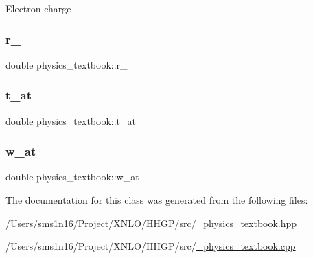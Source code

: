Electron charge \mbox{\label{classphysics__textbook_ac429976f0dc885d846d8b31c24f45bd6}} 
\subsubsection{\texorpdfstring{r\+\_}{r\_0}}
{\footnotesize\ttfamily double physics\+\_\+textbook\+::r\+\_}

\mbox{\label{classphysics__textbook_acdcf772ff70c544f8394b3a9fc57674c}} 
\subsubsection{\texorpdfstring{t\+\_\+at}{t\_at}}
{\footnotesize\ttfamily double physics\+\_\+textbook\+::t\+\_\+at}

\mbox{\label{classphysics__textbook_a63250c79f053fa4aa1c8f3505971b4f1}} 
\subsubsection{\texorpdfstring{w\+\_\+at}{w\_at}}
{\footnotesize\ttfamily double physics\+\_\+textbook\+::w\+\_\+at}



The documentation for this class was generated from the following files\+:\begin{DoxyCompactItemize}
\item 
/\+Users/sms1n16/\+Project/\+X\+N\+L\+O/\+H\+H\+G\+P/src/\hyperlink{__physics__textbook_8hpp}{\+\_\+physics\+\_\+textbook.\+hpp}\item 
/\+Users/sms1n16/\+Project/\+X\+N\+L\+O/\+H\+H\+G\+P/src/\hyperlink{__physics__textbook_8cpp}{\+\_\+physics\+\_\+textbook.\+cpp}\end{DoxyCompactItemize}
